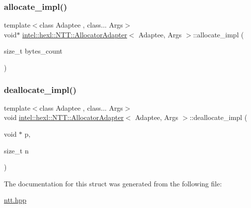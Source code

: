 \subsubsection{\texorpdfstring{allocate\+\_\+impl()}{allocate\_impl()}}
{\footnotesize\ttfamily template$<$class Adaptee , class... Args$>$ \\
void$\ast$ \hyperlink{structintel_1_1hexl_1_1NTT_1_1AllocatorAdapter}{intel\+::hexl\+::\+N\+T\+T\+::\+Allocator\+Adapter}$<$ Adaptee, Args $>$\+::allocate\+\_\+impl (\begin{DoxyParamCaption}\item[{size\+\_\+t}]{bytes\+\_\+count }\end{DoxyParamCaption})}

\mbox{\label{structintel_1_1hexl_1_1NTT_1_1AllocatorAdapter_a123aa02665ce9f2b219ca9b88164e114}} 
\subsubsection{\texorpdfstring{deallocate\+\_\+impl()}{deallocate\_impl()}}
{\footnotesize\ttfamily template$<$class Adaptee , class... Args$>$ \\
void \hyperlink{structintel_1_1hexl_1_1NTT_1_1AllocatorAdapter}{intel\+::hexl\+::\+N\+T\+T\+::\+Allocator\+Adapter}$<$ Adaptee, Args $>$\+::deallocate\+\_\+impl (\begin{DoxyParamCaption}\item[{void $\ast$}]{p,  }\item[{size\+\_\+t}]{n }\end{DoxyParamCaption})}



The documentation for this struct was generated from the following file\+:\begin{DoxyCompactItemize}
\item 
\hyperlink{ntt_8hpp}{ntt.\+hpp}\end{DoxyCompactItemize}
